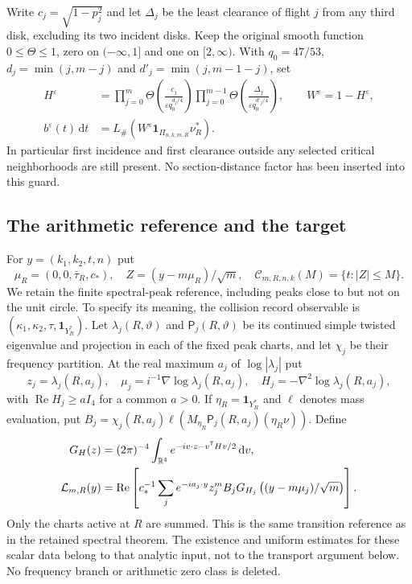 \documentclass[11pt,reqno]{amsart}
\numberwithin{equation}{section}
\theoremstyle{definition}\newtheorem{definition}[theorem]{Definition}
\theoremstyle{remark}\newtheorem{remark}[theorem]{Remark}
\newcommand{\R}{\mathbb R}\newcommand{\Z}{\mathbb Z}\newcommand{\T}{\mathbb T}
\newcommand{\dd}{\,\mathrm d}\newcommand{\one}{\mathbf1}
\theoremstyle{definition}\newtheorem{inputstatement}[theorem]{Input statement}
\begin{document}
Write $c_j=\sqrt{1-p_j^2}$ and let $\Delta_j$ be the least clearance
of flight $j$ from any third disk, excluding its two incident disks.
Keep the original smooth function $0\le\Theta\le1$, zero on
$(-\infty,1]$ and one on $[2,\infty)$. With $q_0=47/53$,
$d_j=\min(j,m-j)$ and $d'_j=\min(j,m-1-j)$, set
\begin{align}
 H^\varepsilon&=
 \prod_{j=0}^{m}\Theta\!\left(\frac{c_j}{\varepsilon q_0^{d_j/4}}\right)
 \prod_{j=0}^{m-1}\Theta\!\left(\frac{\Delta_j}{\varepsilon q_0^{d'_j/4}}\right),
 \qquad W^\varepsilon=1-H^\varepsilon,\label{eq:v76-guard}\\
 b^\varepsilon(t)\dd t
   &=L_\#(W^\varepsilon\one_{\Pi_{n,k,m,R}}\nu_R^*).
 \label{eq:v76-source}
\end{align}
In particular first incidence and first clearance outside any selected
critical neighborhoods are still present. No section-distance factor
has been inserted into this guard.

\subsection{The arithmetic reference and the target}
For $y=(k_1,k_2,t,n)$ put
\[
 \mu_R=(0,0,\bar\tau_R,c_*),\quad
 Z=(y-m\mu_R)/\sqrt m,\quad
 \mathcal C_{m,R,n,k}(M)=\{t:|Z|\le M\}.
\]
We retain the finite spectral-peak reference, including peaks close to
but not on the unit circle. To specify its meaning, the collision
record observable is $(\kappa_1,\kappa_2,\tau,\one_{Y_R^*})$.
Let $\lambda_j(R,\vartheta)$ and $\mathsf P_j(R,\vartheta)$ be its
continued simple twisted eigenvalue and projection in each of the
fixed peak charts, and let $\chi_j$ be their frequency partition.
At the real maximum $a_j$ of $\log|\lambda_j|$ put
\[
 z_j=\lambda_j(R,a_j),\quad
 \mu_j=i^{-1}\nabla\log\lambda_j(R,a_j),\quad
 H_j=-\nabla^2\log\lambda_j(R,a_j),
\]
with $\operatorname{Re}H_j\ge aI_4$ for a common $a>0$. If
$\eta_R=\one_{Y_R^*}$ and $\ell$ denotes mass evaluation, put
$B_j=\chi_j(R,a_j)\ell(M_{\eta_R}\mathsf P_j(R,a_j)(\eta_R\nu))$.
Define
\begin{align}
 G_H(z)&=(2\pi)^{-4}\int_{\R^4}e^{-iv\cdot z-v^{\mathsf T}Hv/2}\dd v,
 \notag\\
 \mathcal L_{m,R}(y)&=\operatorname{Re}\left[
 c_*^{-1}\sum_j e^{-ia_j\cdot y}z_j^m B_j
      G_{H_j}\left((y-m\mu_j)/\sqrt m\right)\right].
 \label{eq:v76-reference}
\end{align}
Only the charts active at $R$ are summed. This is the same transition
reference as in the retained spectral theorem. The existence and
uniform estimates for these scalar data belong to that analytic
input, not to the transport argument below. No frequency branch or
arithmetic zero class is deleted.
\end{document}
